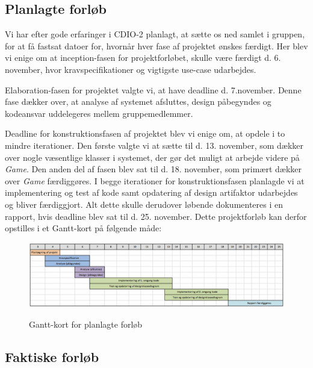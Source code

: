 \documentclass[../main.tex]{subfiles}
\begin{document}
\subsection{Planlagte forløb}
\begin{flushleft}
Vi har efter gode erfaringer i CDIO-2 planlagt, at sætte os ned samlet i gruppen, for at få fastsat datoer for, hvornår hver fase af projektet  ønskes færdigt. Her blev vi enige om at inception-fasen for projektforløbet, skulle være færdigt d. 6. november, hvor kravspecifikationer og vigtigste use-case udarbejdes.\newline

Elaboration-fasen for projektet valgte vi, at have deadline d. 7.november. Denne fase dækker over, at analyse af systemet afsluttes, design påbegyndes og kodeansvar uddelegeres mellem gruppemedlemmer. \newline

Deadline for konstruktionsfasen af projektet blev vi enige om, at opdele i to mindre iterationer. Den første valgte vi at sætte til d. 13. november, som dækker over nogle væsentlige klasser i systemet, der gør det muligt at arbejde videre på \textit{Game}. Den anden del af fasen blev sat til d. 18. november, som primært dækker over \textit{Game} færdiggøres. I begge iterationer for konstruktionsfasen planlagde vi at implementering og test af kode samt opdatering af design artifaktor udarbejdes og bliver færdiggjort. Alt dette skulle derudover løbende dokumenteres i en rapport, hvis deadline blev sat til d. 25. november. Dette projektforløb kan derfor opstilles i et Gantt-kort på følgende måde:
\end{flushleft}

\begin{figure}[H]
    \begin{center}
   {\includegraphics[width=0.7\textheight]{figures/Gantt-1.png}}
    \caption{Gantt-kort for planlagte forløb}
    \end{center}
\end{figure}  


\subsection{Faktiske forløb}
\end{document}

